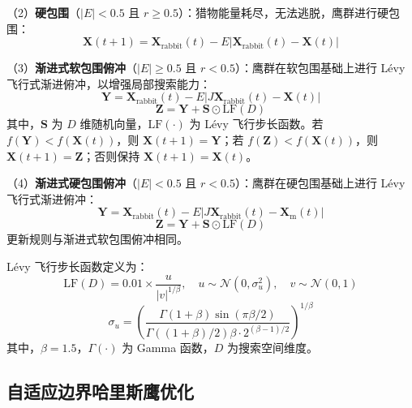 \documentclass[12pt,a4paper]{article}
\begin{document}
（2）\textbf{硬包围}（$|E| < 0.5$ 且 $r \geq 0.5$）：猎物能量耗尽，无法逃脱，鹰群进行硬包围：
\begin{equation}
    \mathbf{X}(t+1) = \mathbf{X}_{\mathrm{rabbit}}(t) - E|\mathbf{X}_{\mathrm{rabbit}}(t) - \mathbf{X}(t)|
    \label{eq:hard_besiege}
\end{equation}

（3）\textbf{渐进式软包围俯冲}（$|E| \geq 0.5$ 且 $r < 0.5$）：鹰群在软包围基础上进行 L\'evy 飞行式渐进俯冲，以增强局部搜索能力：
\begin{equation}
    \mathbf{Y} = \mathbf{X}_{\mathrm{rabbit}}(t) - E|J\mathbf{X}_{\mathrm{rabbit}}(t) - \mathbf{X}(t)|
    \label{eq:soft_dive_Y}
\end{equation}
\begin{equation}
    \mathbf{Z} = \mathbf{Y} + \mathbf{S} \odot \mathrm{LF}(D)
    \label{eq:soft_dive_Z}
\end{equation}
其中，$\mathbf{S}$ 为 $D$ 维随机向量，$\mathrm{LF}(\cdot)$ 为 L\'evy 飞行步长函数。若 $f(\mathbf{Y}) < f(\mathbf{X}(t))$，则 $\mathbf{X}(t+1) = \mathbf{Y}$；若 $f(\mathbf{Z}) < f(\mathbf{X}(t))$，则 $\mathbf{X}(t+1) = \mathbf{Z}$；否则保持 $\mathbf{X}(t+1) = \mathbf{X}(t)$。

（4）\textbf{渐进式硬包围俯冲}（$|E| < 0.5$ 且 $r < 0.5$）：鹰群在硬包围基础上进行 L\'evy 飞行式渐进俯冲：
\begin{equation}
    \mathbf{Y} = \mathbf{X}_{\mathrm{rabbit}}(t) - E|J\mathbf{X}_{\mathrm{rabbit}}(t) - \mathbf{X}_{\mathrm{m}}(t)|
    \label{eq:hard_dive_Y}
\end{equation}
\begin{equation}
    \mathbf{Z} = \mathbf{Y} + \mathbf{S} \odot \mathrm{LF}(D)
    \label{eq:hard_dive_Z}
\end{equation}
更新规则与渐进式软包围俯冲相同。

L\'evy 飞行步长函数定义为：
\begin{equation}
    \mathrm{LF}(D) = 0.01 \times \frac{u}{|v|^{1/\beta}}, \quad u \sim \mathcal{N}(0, \sigma_u^2), \quad v \sim \mathcal{N}(0, 1)
    \label{eq:levy}
\end{equation}
\begin{equation}
    \sigma_u = \left(\frac{\Gamma(1+\beta)\sin(\pi\beta/2)}{\Gamma((1+\beta)/2)\beta \cdot 2^{(\beta-1)/2}}\right)^{1/\beta}
    \label{eq:levy_sigma}
\end{equation}
其中，$\beta = 1.5$，$\Gamma(\cdot)$ 为 Gamma 函数，$D$ 为搜索空间维度。

\subsection{自适应边界哈里斯鹰优化}
\end{document}
